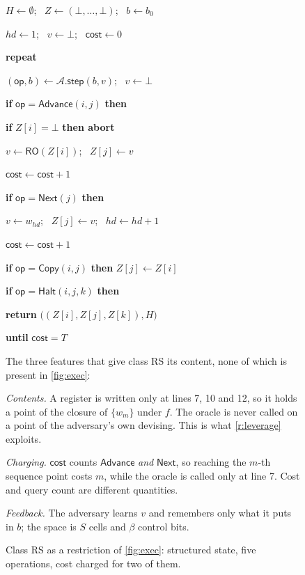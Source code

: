 \documentclass[11pt]{article}
\theoremstyle{plain}
\theoremstyle{definition}
\newcommand{\advers}{\mathcal{A}}
\newcommand{\Advance}{\mathsf{Advance}}
\newcommand{\Next}{\mathsf{Next}}
\newcommand{\Copy}{\mathsf{Copy}}
\newcommand{\cls}[1]{\textsf{#1}}   %
\newcommand{\Halt}{\mathsf{Halt}}
\newcommand{\stp}{\mathsf{step}}
\newcommand{\Exec}{\mathrm{EXEC}}
\newcommand{\RO}{\mathsf{RO}}
\newcommand{\gname}[1]{\underline{\smash{#1}}\vspace{2pt}}
\begin{document}
\begin{figure}[t]
\begin{minipage}[t]{0.53\textwidth}
\begin{gbox}
\gname{$\mathsf{Game}~\Exec\text{-}\mathrm{REG}^{\advers}_{N,T}$}
\begin{pc}
\item $H \gets \emptyset$; \ $Z \gets (\bot,\dots,\bot)$; \ $b \gets b_{0}$
\item $hd \gets 1$; \ $v \gets \bot$; \ $\mathsf{cost} \gets 0$
\item \textbf{repeat}
\item \quad $(\mathsf{op},b) \gets \advers.\stp(b,v)$; \ $v \gets \bot$
\item \quad \textbf{if} $\mathsf{op} = \Advance(i,j)$ \textbf{then}
\item \quad\quad \textbf{if} $Z[i] = \bot$ \textbf{then abort}
\item \quad\quad $v \gets \RO(Z[i])$; \ $Z[j] \gets v$
\item \quad\quad $\mathsf{cost} \gets \mathsf{cost}+1$
\item \quad \textbf{if} $\mathsf{op} = \Next(j)$ \textbf{then}
\item \quad\quad $v \gets w_{hd}$; \ $Z[j] \gets v$; \ $hd \gets hd+1$
\item \quad\quad $\mathsf{cost} \gets \mathsf{cost}+1$
\item \quad \textbf{if} $\mathsf{op} = \Copy(i,j)$ \textbf{then} $Z[j] \gets Z[i]$
\item \quad \textbf{if} $\mathsf{op} = \Halt(i,j,k)$ \textbf{then}
\item \quad\quad \textbf{return} $\bigl((Z[i],Z[j],Z[k]),H\bigr)$
\item \textbf{until} $\mathsf{cost} = T$
\end{pc}
\end{gbox}
\end{minipage}\hfill
\begin{minipage}[t]{0.43\textwidth}
\small
The three features that give class \cls{RS} its content, none of which is
present in \cref{fig:exec}:

\smallskip
\emph{Contents.}  A register is written only at lines 7, 10 and 12, so it
holds a point of the closure of $\{w_{m}\}$ under $f$.  The oracle is never
called on a point of the adversary's own devising.  This is what
\cref{r:leverage} exploits.

\smallskip
\emph{Charging.}  $\mathsf{cost}$ counts $\Advance$ \emph{and} $\Next$, so
reaching the $m$-th sequence point costs $m$, while the oracle is called
only at line 7.  Cost and query count are different quantities.

\smallskip
\emph{Feedback.}  The adversary learns $v$ and remembers only what it puts
in $b$; the space is $S$ cells and $\beta$ control bits.
\end{minipage}
\caption{Class \cls{RS} as a restriction of \cref{fig:exec}: structured
state, five operations, cost charged for two of them.}
\label{fig:reg}
\end{figure}
\end{document}

